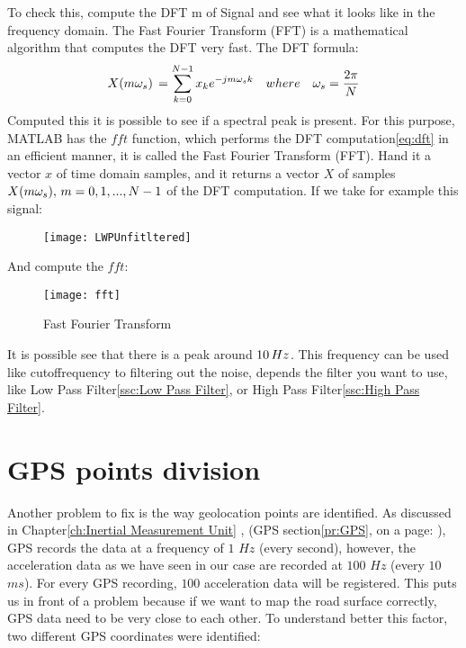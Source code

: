 \documentclass[tesi]{subfiles}
\begin{document}
To check this, compute the DFT m of Signal and see what it looks like in the frequency domain. The Fast Fourier Transform (FFT) is a mathematical algorithm that computes the DFT very fast.
The DFT formula:
\begin{equation}
X(m\omega_{s})\thinspace = \sum\limits_{k=0}^{N- 1} x_{k} e^{-jm\omega_{s}k}
\quad where \quad \omega_{s} = \dfrac{2\pi}{N}
\end{equation}\label{eq:dft}
\noindent Computed this it is possible to see if a spectral peak is present. For this purpose, MATLAB has the $fft$ function, which performs the DFT computation\ref{eq:dft} in an efficient manner, it is called the Fast Fourier Transform (FFT). Hand it a vector $x$ of time domain samples, and it returns a vector $X$ of samples $X(m\omega_{s}),\thinspace m = 0, 1,..., N-  1$ of the DFT computation.
If we take for example this signal:
\begin{figure}[H]
\texttt{[image: LWPUnfitltered]}
\end{figure}
\noindent And compute the $fft$:
\begin{figure}[H]
\centering
\texttt{[image: fft]}
\caption{Fast Fourier Transform}
\end{figure}\label{fig: Fast Fourier Transform}

It is possible see that there is a peak around $10 \thinspace Hz$. This frequency can be used like cutoffrequency to filtering out the noise, depends the filter you want to use, like Low Pass Filter\ref{ssc:Low Pass Filter}, or High Pass Filter\ref{ssc:High Pass Filter}.



\section{GPS points division} \label{sc:GPS points division}
Another problem to fix is the way geolocation points are identified.
As discussed in Chapter\ref{ch:Inertial Measurement Unit} , (GPS section\ref{pr:GPS}, on a page: \pageref{pr:GPS}), GPS records the data at a frequency of $1$ $Hz$ (every second), however, the acceleration data as we have seen in our case are recorded at $100$ $Hz$ (every $10$ $ms$). 
For every GPS recording, $100$ acceleration data will be registered. This puts us in front of a problem because if we want to map the road surface correctly, GPS data need to be very close to each other.
To understand better this factor, two different GPS coordinates were identified:
\end{document}
